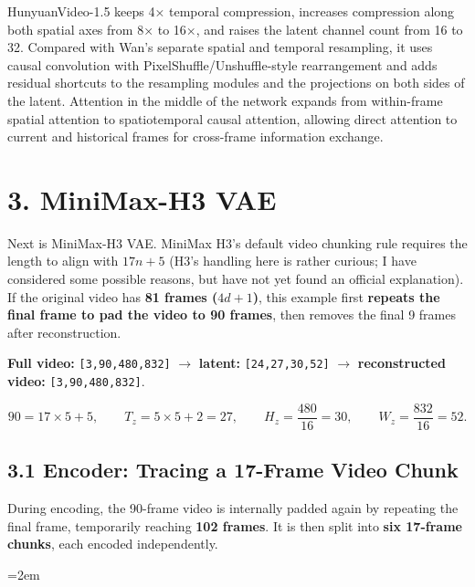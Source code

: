 \documentclass[
  11pt,
  a4paper,
]{article}
\newcommand{\NotesTableStyle}{\linespread{1}\fontsize{9.5pt}{13pt}\selectfont\setlength{\tabcolsep}{4pt}\renewcommand{\arraystretch}{1.1}\setlength{\extrarowheight}{5pt}\setlength{\LTpre}{5pt}\setlength{\LTpost}{6pt}\setlength{\parskip}{0pt}\emergencystretch=2em}
\newcommand{\NotesHThreeLayout}{%
  \clearpage
  \fancyhead[L]{\small\sffamily\color{notesgray}Video VAE / MiniMax-H3 Details}%
}
\begin{document}
HunyuanVideo-1.5 keeps 4× temporal compression, increases compression
along both spatial axes from 8× to 16×, and raises the latent channel
count from 16 to 32. Compared with Wan's separate spatial and temporal
resampling, it uses causal convolution with PixelShuffle/Unshuffle-style
rearrangement and adds residual shortcuts to the resampling modules and
the projections on both sides of the latent. Attention in the middle of
the network expands from within-frame spatial attention to
spatiotemporal causal attention, allowing direct attention to current
and historical frames for cross-frame information exchange.

\NotesHThreeLayout

\section{3. MiniMax-H3 VAE}\label{minimax-h3}

Next is MiniMax-H3 VAE. MiniMax H3's default video chunking rule
requires the length to align with \textbf{\(17n+5\)} (H3's handling here
is rather curious; I have considered some possible reasons, but have not
yet found an official explanation). If the original video has \textbf{81
frames (\(4d+1\))}, this example first \textbf{repeats the final frame
to pad the video to 90 frames}, then removes the final 9 frames after
reconstruction.

\textbf{Full video:} \texttt{{[}3,90,480,832{]}} \(\rightarrow\)
\textbf{latent:} \texttt{{[}24,27,30,52{]}} \(\rightarrow\)
\textbf{reconstructed video:} \texttt{{[}3,90,480,832{]}}.

\[
90=17\times5+5,\qquad T_z=5\times5+2=27,\qquad H_z=\frac{480}{16}=30,\qquad W_z=\frac{832}{16}=52.
\]


\subsection{3.1 Encoder: Tracing a 17-Frame Video
Chunk}\label{h3-encoder}

During encoding, the 90-frame video is internally padded again by
repeating the final frame, temporarily reaching \textbf{102 frames}. It
is then split into \textbf{six 17-frame chunks}, each encoded
independently.

\begingroup\NotesTableStyle\fontsize{10pt}{12pt}\selectfont\renewcommand{\arraystretch}{1.02}\setlength{\extrarowheight}{1pt}
\end{document}
